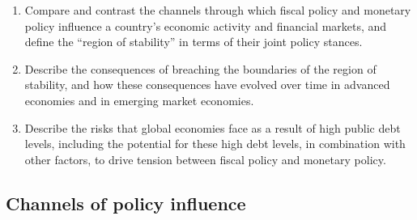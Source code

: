 
\begin{cikeybox}[title={The three objectives, in the spine's own words}]
\begin{enumerate}[label=\textbf{\alph*.}]
\item Compare and contrast the channels through which fiscal policy and monetary policy
influence a country's economic activity and financial markets, and define the ``region of
stability'' in terms of their joint policy stances.
\item Describe the consequences of breaching the boundaries of the region of stability, and
how these consequences have evolved over time in advanced economies and in emerging market
economies.
\item Describe the risks that global economies face as a result of high public debt levels,
including the potential for these high debt levels, in combination with other factors, to
drive tension between fiscal policy and monetary policy.
\end{enumerate}
\end{cikeybox}


\subsection*{Channels of policy influence}

